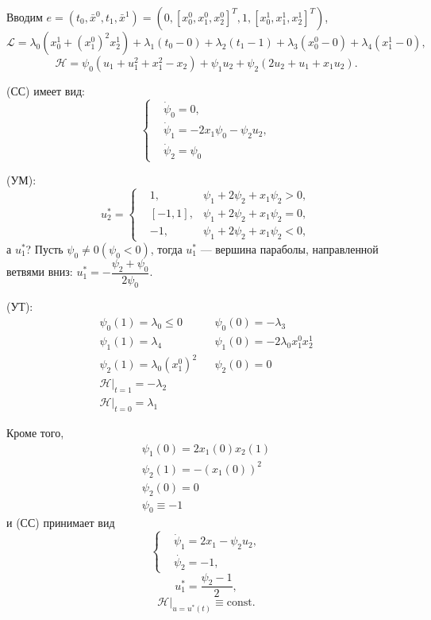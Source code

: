 \documentclass[12pt, a4paper]{article}
\theoremstyle{rusdef}
\renewcommand{\H}{\mathcal{H}} %
\renewcommand{\L}{\mathscr{L}} %
\begin{document}
Вводим $e = (t_0, \bar{x}^0, t_1, \bar{x}^1) = (0, [x_0^0, x_1^0, x_2^0]^T, 1, [x_0^1, x_1^1, x_2^1]^T)$,
$$
\L = \lambda_0(x_0^1 + (x_1^0)^2 x_2^1) + \lambda_1(t_0 - 0) + \lambda_2(t_1 - 1) + \lambda_3(x_0^0 - 0) + \lambda_4(x_1^1 - 0),
$$
$$
\H = \psi_0(u_1 + u_1^2 + x_1^2 - x_2) + \psi_1 u_2 + \psi_2(2 u_2 + u_1 + x_1 u_2).
$$

(СС) имеет вид:
$$
\left\{
\begin{aligned}
& \dot{\psi}_0 = 0, \\
& \dot{\psi}_1 = -2 x_1 \psi_0 - \psi_2 u_2, \\
& \dot{\psi}_2 = \psi_0
\end{aligned}
\right.
$$

(УМ):
$$
u_2^* = 
\left\{
\begin{aligned}
& 1, & \psi_1 + 2\psi_2 + x_1 \psi_2 > 0, \\
& [-1, 1], & \psi_1 + 2\psi_2 + x_1 \psi_2 = 0, \\
& -1, & \psi_1 + 2\psi_2 + x_1 \psi_2 < 0,
\end{aligned}
\right.
$$
а $u_1^*$? Пусть $\psi_0 \neq 0 (\psi_0 < 0)$, тогда $u_1^*$ --- вершина параболы, направленной ветвями вниз: $u_1^* = - \dfrac{\psi_2 + \psi_0}{2 \psi_0}$.

(УТ):
$$
\begin{matrix}
\psi_0(1) = \lambda_0 \leqslant 0 & & \psi_0(0) = -\lambda_3 \\
\psi_1(1) = \lambda_4 & & \psi_1(0) = -2\lambda_0 x_1^0 x_2^1 \\
\psi_2(1) = \lambda_0(x_1^0)^2 & & \psi_2(0) = 0 \\
\H |_{t = 1} = -\lambda_2\\
\H |_{t = 0} = \lambda_1
\end{matrix}
$$

Кроме того,
$$
\begin{matrix}
\psi_1(0) = 2 x_1(0) x_2(1)\\
\psi_2(1) = -(x_1(0))^2\\
\psi_2(0) = 0 \\
\psi_0 \equiv -1
\end{matrix}
$$
и (СС) принимает вид
$$
\left\{
\begin{aligned}
& \dot{\psi}_1 = 2 x_1 - \psi_2 u_2, \\
& \dot{\psi_2} = -1,
\end{aligned}
\right.
$$
$$
u_1^* = \dfrac{\psi_2 - 1}{2},
$$
$$
\H|_{u = u^*(t)} \equiv \mathrm{const}.
$$
\end{document}
